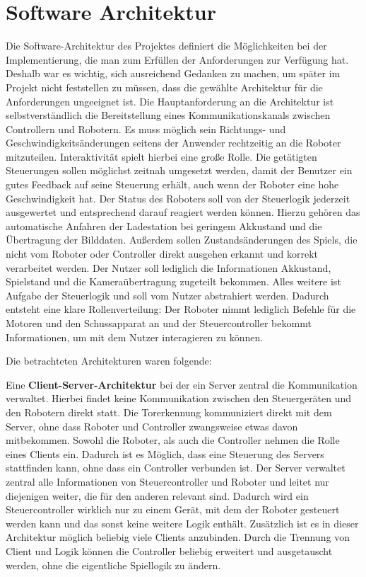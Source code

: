 \chapter{Software Architektur}
\label{ch:software-architektur}

Die Software-Architektur des Projektes definiert die Möglichkeiten bei der Implementierung, die man zum Erfüllen der Anforderungen zur Verfügung hat. Deshalb war es wichtig, sich ausreichend Gedanken zu machen, um später im Projekt nicht feststellen zu müssen, dass die gewählte Architektur für die Anforderungen ungeeignet ist. Die Hauptanforderung an die Architektur ist selbstverständlich die Bereitstellung eines Kommunikationskanals zwischen Controllern und Robotern. Es muss möglich sein Richtungs- und Geschwindigkeitsänderungen seitens der Anwender rechtzeitig an die Roboter mitzuteilen. Interaktivität spielt hierbei eine große Rolle. Die getätigten Steuerungen sollen möglichst zeitnah umgesetzt werden, damit der Benutzer ein gutes Feedback auf seine Steuerung erhält, auch wenn der Roboter eine hohe Geschwindigkeit hat. Der Status des Roboters soll von der Steuerlogik jederzeit ausgewertet und entsprechend darauf reagiert werden können. Hierzu gehören das automatische Anfahren der Ladestation bei geringem Akkustand und die Übertragung der Bilddaten. Außerdem sollen Zustandsänderungen des Spiels, die nicht vom Roboter oder Controller direkt ausgehen erkannt und korrekt verarbeitet werden. Der Nutzer soll lediglich die Informationen Akkustand, Spielstand und die Kameraübertragung zugeteilt bekommen. Alles weitere ist Aufgabe der Steuerlogik und soll vom Nutzer abstrahiert werden. Dadurch entsteht eine klare Rollenverteilung: Der Roboter nimmt lediglich Befehle für die Motoren und den Schussapparat an und der Steuercontroller bekommt Informationen, um mit dem Nutzer interagieren zu können.

Die betrachteten Architekturen waren folgende:

Eine \textbf{Client-Server-Architektur} bei der ein Server zentral die Kommunikation verwaltet. Hierbei findet keine Kommunikation zwischen den Steuergeräten und den Robotern direkt statt. Die Torerkennung kommuniziert direkt mit dem Server, ohne dass Roboter und Controller zwangsweise etwas davon mitbekommen. Sowohl die Roboter, als auch die Controller nehmen die Rolle eines Clients ein. Dadurch ist es Möglich, dass eine Steuerung des Servers stattfinden kann, ohne dass ein Controller verbunden ist. Der Server verwaltet zentral alle Informationen von Steuercontroller und Roboter und leitet nur diejenigen weiter, die für den anderen relevant sind. Dadurch wird ein Steuercontroller wirklich nur zu einem Gerät, mit dem der Roboter gesteuert werden kann und das sonst keine weitere Logik enthält. Zusätzlich ist es in dieser Architektur möglich beliebig viele Clients anzubinden. Durch die Trennung von Client und Logik können die Controller beliebig erweitert und ausgetauscht werden, ohne die eigentliche Spiellogik zu ändern.


